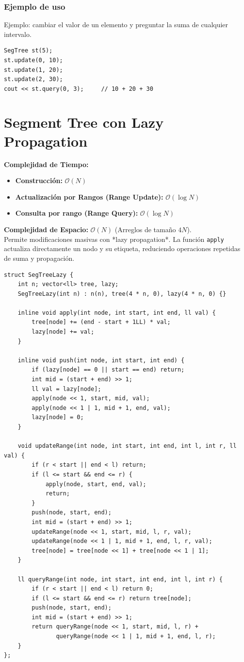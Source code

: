 \documentclass[10pt,twocolumn,letterpaper]{report}
\begin{document}
\subsubsection*{Ejemplo de uso}
Ejemplo: cambiar el valor de un elemento y preguntar la suma de cualquier intervalo.
\begin{lstlisting}
SegTree st(5);
st.update(0, 10);
st.update(1, 20);
st.update(2, 30);
cout << st.query(0, 3);     // 10 + 20 + 30
\end{lstlisting}

\section{Segment Tree con Lazy Propagation}
\textbf{Complejidad de Tiempo:}
\begin{itemize}
    \item \textbf{Construcción:} $\mathcal{O}(N)$
    \item \textbf{Actualización por Rangos (Range Update):} $\mathcal{O}(\log N)$
    \item \textbf{Consulta por rango (Range Query):} $\mathcal{O}(\log N)$
\end{itemize}
\textbf{Complejidad de Espacio:} $\mathcal{O}(N)$ (Arreglos de tamaño $4N$). \\
Permite modificaciones masivas con *lazy propagation*. La función \texttt{apply} actualiza directamente un nodo y su etiqueta, reduciendo operaciones repetidas de suma y propagación.
\begin{lstlisting}
struct SegTreeLazy {
    int n; vector<ll> tree, lazy;
    SegTreeLazy(int n) : n(n), tree(4 * n, 0), lazy(4 * n, 0) {}

    inline void apply(int node, int start, int end, ll val) {
        tree[node] += (end - start + 1LL) * val;
        lazy[node] += val;
    }

    inline void push(int node, int start, int end) {
        if (lazy[node] == 0 || start == end) return;
        int mid = (start + end) >> 1;
        ll val = lazy[node];
        apply(node << 1, start, mid, val);
        apply(node << 1 | 1, mid + 1, end, val);
        lazy[node] = 0;
    }

    void updateRange(int node, int start, int end, int l, int r, ll val) {
        if (r < start || end < l) return;
        if (l <= start && end <= r) {
            apply(node, start, end, val);
            return;
        }
        push(node, start, end);
        int mid = (start + end) >> 1;
        updateRange(node << 1, start, mid, l, r, val);
        updateRange(node << 1 | 1, mid + 1, end, l, r, val);
        tree[node] = tree[node << 1] + tree[node << 1 | 1];
    }

    ll queryRange(int node, int start, int end, int l, int r) {
        if (r < start || end < l) return 0;
        if (l <= start && end <= r) return tree[node];
        push(node, start, end);
        int mid = (start + end) >> 1;
        return queryRange(node << 1, start, mid, l, r) +
               queryRange(node << 1 | 1, mid + 1, end, l, r);
    }
};
\end{lstlisting}
\end{document}
